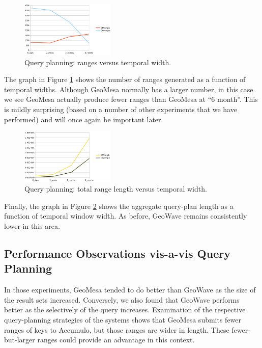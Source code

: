 \begin{figure}[h!tb]
  \centering
  \includegraphics[width=0.40\textwidth]{../docs/img/query-planning/window-ranges.png}
  \caption{Query planning: ranges versus temporal width.}
  \label{planningtimeranges}
\end{figure}

The graph in Figure \ref{planningtimeranges} shows the number of ranges generated as a function of temporal widths.
Although GeoMesa normally has a larger number, in this case we see GeoMesa actually produce fewer ranges than GeoMesa at ``$6$ month''.
This is mildly surprising (based on a number of other experiments that we have performed) and will once again be important later.

\begin{figure}[h!tb]
  \centering
  \includegraphics[width=0.40\textwidth]{../docs/img/query-planning/window-length.png}
  \caption{Query planning: total range length versus temporal width.}
  \label{planningtimelength}
\end{figure}

Finally, the graph in Figure \ref{planningtimelength} shows the aggregate query-plan length as a function of temporal window width.
As before, GeoWave remains consistently lower in this area.

\subsection{Performance Observations vis-a-vis Query Planning}

In those experiments, GeoMesa tended to do better than GeoWave as the size of the result sets increased.
Conversely, we also found that GeoWave performs better as the selectively of the query increases.
Examination of the respective query-planning strategies of the systems shows that GeoMesa submits fewer ranges of keys to Accumulo, but those ranges are wider in length.
These fewer-but-larger ranges could provide an advantage in this context.


